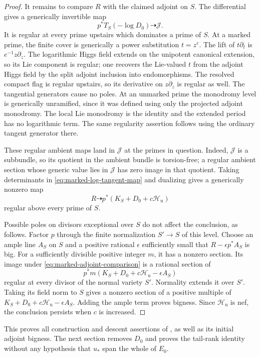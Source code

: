 \begin{proof}
It remains to compare $R$ with the claimed adjoint on $S$.
The differential gives a generically invertible map
\begin{equation}\label{eq:marked-log-tangent-map}
 p^*T_S(-\log D_0)\dashrightarrow\mathcal J.
\end{equation}
It is regular at every prime upstairs which dominates a
prime of $S$.  At a marked prime, the finite cover is
generically a power substitution $t=z^e$.  The lift of
$t\partial_t$ is $e^{-1}z\partial_z$.
The logarithmic Higgs field extends on the unipotent
canonical extension, so its Lie component is regular;
one recovers the Lie-valued $t$ from the adjoint Higgs
field by the split adjoint inclusion into endomorphisms.
The resolved compact flag is regular upstairs, so its
derivative on $z\partial_z$ is regular as well.  The
tangential generators cause no poles.  At an unmarked
prime the monodromy level is generically unramified,
since it was defined using only the projected adjoint
monodromy.  The local Lie monodromy is the identity and
the extended period has no logarithmic term.  The same
regularity assertion follows using the ordinary tangent
generator there.

These regular ambient maps land in $\mathcal J$ at the
primes in question.  Indeed, $\mathcal J$ is a subbundle,
so its quotient in the ambient bundle is torsion-free;
a regular ambient section whose generic value lies in
$\mathcal J$ has zero image in that quotient.  Taking
determinants in \eqref{eq:marked-log-tangent-map} and
dualizing gives a generically nonzero map
\begin{equation}\label{eq:marked-adjoint-comparison}
 R\dashrightarrow p^*(K_S+D_0+c\mathcal H_{\mathrm u})
\end{equation}
regular above every prime of $S$.

Possible poles on divisors exceptional over $S$ do not
affect the conclusion, as follows.  Factor $p$ through
the finite normalization $S'\to S$ of this level.  Choose
an ample line $A_S$ on $S$ and a positive rational
$\epsilon$ sufficiently small that
$R-\epsilon p^*A_S$ is big.  For a sufficiently divisible
positive integer $m$, it has a nonzero section.  Its image
under \eqref{eq:marked-adjoint-comparison} is a rational
section of
\[
 p^*m(K_S+D_0+c\mathcal H_{\mathrm u}-\epsilon A_S)
\]
regular at every divisor of the normal variety $S'$.
Normality extends it over $S'$.  Taking its field norm
to $S$ gives a nonzero section of a positive multiple
of $K_S+D_0+c\mathcal H_{\mathrm u}-\epsilon A_S$.
Adding the ample term proves bigness.  Since
$\mathcal H_{\mathrm u}$ is nef, the conclusion persists
when $c$ is increased.
\end{proof}

This proves all construction and descent assertions of
, as well as its initial adjoint
bigness.  The next section removes $D_0$ and proves the
tail-rank identity without any hypothesis that $u_*$ span
the whole of $E_0$.
